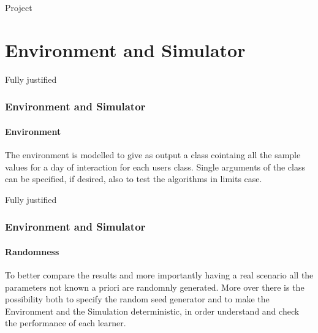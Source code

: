 \documentclass{beamer}
\begin{document}
\frame{\titlepage}

\begin{frame}{Project}
    \tableofcontents[hideallsubsections]
\end{frame}


\AtBeginSection[]
{
\begin{frame}{}
    \tableofcontents[currentsection]
\end{frame}
}


\section{Environment and Simulator}

\begin{frame}{Fully justified}

\frametitle{Environment and Simulator}
\framesubtitle{Environment}
The environment is modelled to give as output a class cointaing all the sample values for a day of interaction for each users class.
Single arguments of the class can be specified, if desired, also to test the algorithms in limits case.

\end{frame}


\begin {frame} {Fully justified}

\frametitle{Environment and Simulator}
\framesubtitle{Randomness}
To better compare the results and more importantly having a real scenario all the parameters not known a priori are randomnly generated.
More over there is the possibility both to specify the random seed generator and to make the Environment and the Simulation deterministic, in order understand and check the performance of each learner.

\end {frame}

\end{document}
